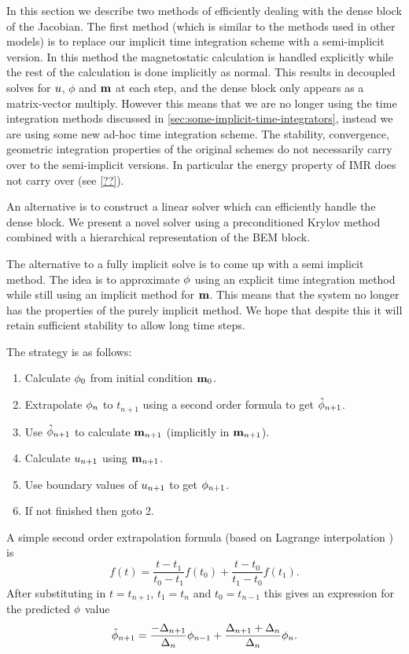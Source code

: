In this section we describe two methods of efficiently dealing with the dense block of the Jacobian.
The first method (which is similar to the methods used in other models) is to replace our implicit time integration scheme with a semi-implicit version.
In this method the magnetostatic calculation is handled explicitly while the rest of the calculation is done implicitly as normal.
This results in decoupled solves for $u$, $\phi$ and $\boldsymbol{\mathrm{m}}$ at each step, and the dense block only appears as a matrix-vector multiply.
However this means that we are no longer using the time integration methods discussed in \cref{sec:some-implicit-time-integrators}, instead we are using some new ad-hoc time integration scheme.
The stability, convergence, geometric integration properties of the original schemes do not necessarily carry over to the semi-implicit versions.
In particular the energy property of IMR does not carry over (see \cref{??}).

An alternative is to construct a linear solver which can efficiently handle the dense block.
We present a novel solver using a preconditioned Krylov method combined with a hierarchical representation of the BEM block.


The alternative to a fully implicit solve is to come up with a semi implicit method.
The idea is to approximate $\phi$ using an explicit time integration method while still using an implicit method for $\boldsymbol{\mathrm{m}}$.
This means that the system no longer has the properties of the purely implicit method.
We hope that despite this it will retain sufficient stability to allow long time steps.

The strategy is as follows:
\begin{enumerate}
\item Calculate $\phi_0$ from initial condition $\boldsymbol{\mathrm{m}}_0$.
\item Extrapolate $\phi_n$ to $t_{n+1}$ using a second order formula to get $\hat{\phi}_{n+1}$.
\item Use $\hat{\phi}_{n+1}$ to calculate $\boldsymbol{\mathrm{m}}_{n+1}$ (implicitly in $\boldsymbol{\mathrm{m}}_{n+1}$).
\item Calculate $u_{n+1}$ using $\boldsymbol{\mathrm{m}}_{n+1}$.
\item Use boundary values of $u_{n+1}$ to get $\phi_{n+1}$.
\item If not finished then goto 2.
\end{enumerate}

A simple second order extrapolation formula (based on Lagrange interpolation \cite[312]{Kincaid2002}) is 
\begin{equation}
  \label{eq:65}
  f(t) = \frac{t - t_1}{t_0 - t_1}f(t_0) + \frac{t - t_0}{t_1 - t_0}f(t_1).
\end{equation}
After substituting in $t=t_{n+1}$, $t_1=t_n$ and $t_0=t_{n-1}$ this gives an expression for the predicted $\phi$ value
\begin{equation}
  \label{eq:66}
  \hat{\phi}_{n+1} = \frac{-\Delta_{n+1}}{\Delta_{n}} \phi_{n-1} + \frac{\Delta_{n+1} + \Delta_{n}}{\Delta_{n}} \phi_n.
\end{equation}

